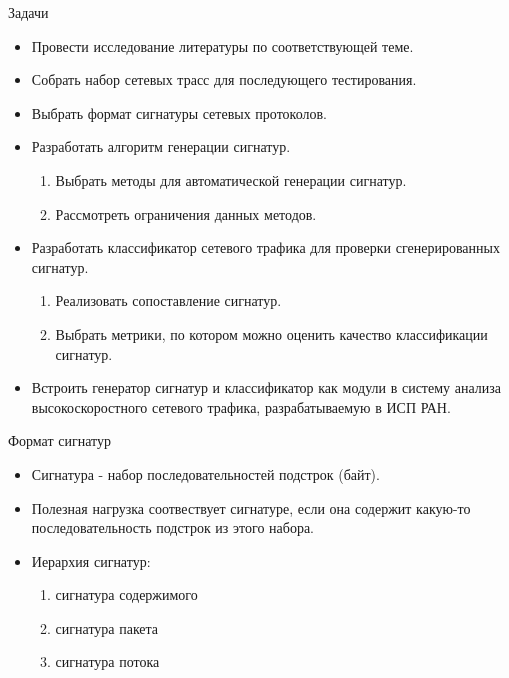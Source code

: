 \documentclass[10pt]{beamer}
\begin{document}
\begin{frame}{Задачи}
    \begin{itemize}
        \item Провести исследование литературы по соответствующей теме.
        \item Собрать набор сетевых трасс для последующего тестирования.
        \item Выбрать формат сигнатуры сетевых протоколов.
        \item Разработать алгоритм генерации сигнатур.
        \begin{enumerate}
            \item Выбрать методы для автоматической генерации сигнатур.
            \item Рассмотреть ограничения данных методов.
        \end{enumerate}
        \item Разработать классификатор сетевого трафика для проверки сгенерированных сигнатур.
        \begin{enumerate}
            \item Реализовать сопоставление сигнатур.
            \item Выбрать метрики, по котором можно оценить качество классификации сигнатур.
        \end{enumerate}
        \item Встроить генератор сигнатур и классификатор как модули в систему анализа высокоскоростного сетевого трафика, разрабатываемую в ИСП РАН.
    \end{itemize}
\end{frame}

\begin{frame}{Формат сигнатур}
    \begin{itemize}
        \item Сигнатура - набор последовательностей подстрок (байт).
        \item Полезная нагрузка соотвествует
        сигнатуре, если она содержит какую-то последовательность подстрок из этого набора.
        \item Иерархия сигнатур:
        \begin{enumerate}
            \item сигнатура содержимого
            \item сигнатура пакета
            \item сигнатура потока
        \end{enumerate}
    \end{itemize}
\end{frame}
\end{document}
